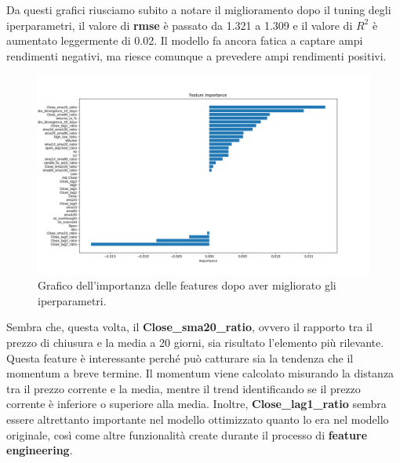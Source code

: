 \documentclass{article}
\begin{document}
\newpage
Da questi grafici riusciamo subito a notare il miglioramento dopo il tuning degli iperparametri, il valore di \textbf{rmse} è passato da 1.321 a 1.309 e il valore di $R^2$ è aumentato leggermente di 0.02.
Il modello fa ancora fatica a captare ampi rendimenti negativi, ma riesce comunque a prevedere ampi rendimenti positivi.
\begin{figure}[H]
\centering
\includegraphics[width=1\linewidth]{featureImportanceOttimizzato.png}
\caption{\label{fig:scatterPlotOttimizzato}Grafico dell'importanza delle features dopo aver migliorato gli iperparametri.}
\end{figure}
Sembra che, questa volta, il \textbf{Close\_sma20\_ratio}, ovvero il rapporto tra il prezzo di chiusura e la media a 20 giorni, sia risultato l'elemento più rilevante. Questa feature è interessante perché può catturare sia la tendenza che il momentum a breve termine. Il momentum viene calcolato misurando la distanza tra il prezzo corrente e la media, mentre il trend identificando se il prezzo corrente è inferiore o superiore alla media. Inoltre, \textbf{Close\_lag1\_ratio} sembra essere altrettanto importante nel modello ottimizzato quanto lo era nel modello originale, così come altre funzionalità create durante il processo di \textbf{feature engineering}.
\newpage
\end{document}
